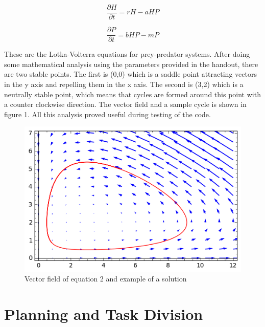 \documentclass[12pt,a4paper]{article}
\begin{document}
\begin{equation}
\frac{\partial H}{\partial t}=rH-aHP
\end{equation}

\begin{equation}
\frac{\partial P}{\partial t}=bHP-mP
\end{equation}

These are the Lotka-Volterra equations for prey-predator systems. After doing some mathematical analysis using the parameters provided in the handout, there are two stable points. The first is (0,0) which is a saddle point attracting vectors in the y axis and repelling them in the x axis. The second is (3,2) which is a neutrally stable point, which means that cycles are formed around this point with a counter clockwise direction. The vector field and a sample cycle is shown in figure 1. All this analysis proved useful during testing of the code.  %


\clearpage


\begin{figure}[hb]
    \centering
    \includegraphics[scale=0.75]{images/sage2.png}
    \caption{Vector field of equation 2 and example of a solution}
\end{figure}



\section{Planning and Task Division}
\end{document}
